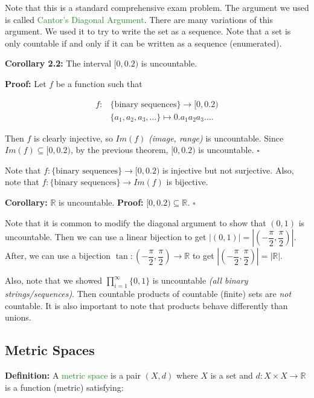 \documentclass{article}
\begin{document}
Note that this is a standard comprehensive exam problem. The argument we used is called \textcolor{ForestGreen}{Cantor's Diagonal Argument}. There are many variations of this argument. We used it to try to write the set as a sequence. Note that a set is only countable if and only if it can be written as a sequence (enumerated).

\textbf{Corollary 2.2:} The interval $[0,0.2)$ is uncountable.

\textbf{Proof:} Let $f$ be a function such that 

\begin{align*}
    f:&\{\text{binary sequences}\} \longrightarrow [0,0.2)\\
    &\{a_1, a_2, a_3, \dots \} \longmapsto 0.a_1 a_2 a_3 \dots .
\end{align*}

Then $f$ is clearly injective, so $Im(f)$ \textit{(image, range)} is uncountable. Since $Im(f) \subseteq [0,0.2)$, by the previous theorem, $[0,0.2)$ is uncountable. $\square$

Note that $f:\{\text{binary sequences}\} \longrightarrow [0,0.2)$ is injective but not surjective. Also, note that $f:\{\text{binary sequences}\} \longrightarrow Im(f)$ is bijective.

\textbf{Corollary:} $\mathbb{R}$ is uncountable.
\textbf{Proof:} $[0,0.2) \subseteq \mathbb{R}$. $\square$

Note that it is common to modify the diagonal argument to show that $(0,1)$ is uncountable. Then we can use a linear bijection to get $|(0,1)|=\left|\left(-\dfrac{\pi}{2},\dfrac{\pi}{2}\right)\right|$. After, we can use a bijection $\tan:\left(-\dfrac{\pi}{2},\dfrac{\pi}{2}\right) \longrightarrow \mathbb{R}$ to get $\left|\left(-\dfrac{\pi}{2},\dfrac{\pi}{2}\right)\right|=|\mathbb{R}|$.

Also, note that we showed $\prod_{i=1}^{\infty} \{0,1\}$ is uncountable \textit{(all binary strings/sequences)}. Then countable products of countable (finite) sets are \textit{not} countable. It is also important to note that products behave differently than unions.

\newpage

\subsection{Metric Spaces}

\textbf{Definition:} A \textcolor{ForestGreen}{metric space} is a pair $(X,d)$ where $X$ is a set and $d: X \times X \longrightarrow \mathbb{R}$ is a function (metric) satisfying:
\end{document}
